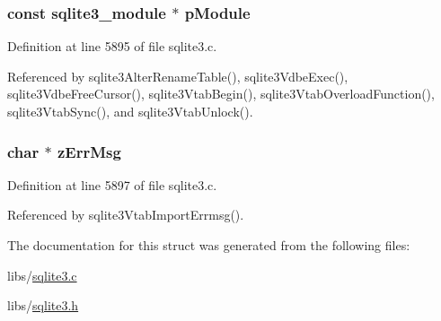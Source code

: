 \hypertarget{structsqlite3__vtab_a68871c21cfdca68ce4a92d7ff3395ce0}{}
\subsubsection[{p\+Module}]{\setlength{\rightskip}{0pt plus 5cm}const {\bf sqlite3\+\_\+module} $\ast$ p\+Module}\label{structsqlite3__vtab_a68871c21cfdca68ce4a92d7ff3395ce0}


Definition at line 5895 of file sqlite3.\+c.



Referenced by sqlite3\+Alter\+Rename\+Table(), sqlite3\+Vdbe\+Exec(), sqlite3\+Vdbe\+Free\+Cursor(), sqlite3\+Vtab\+Begin(), sqlite3\+Vtab\+Overload\+Function(), sqlite3\+Vtab\+Sync(), and sqlite3\+Vtab\+Unlock().

\hypertarget{structsqlite3__vtab_a80b3fc7c10851d42f781fa205fe68c17}{}
\subsubsection[{z\+Err\+Msg}]{\setlength{\rightskip}{0pt plus 5cm}char $\ast$ z\+Err\+Msg}\label{structsqlite3__vtab_a80b3fc7c10851d42f781fa205fe68c17}


Definition at line 5897 of file sqlite3.\+c.



Referenced by sqlite3\+Vtab\+Import\+Errmsg().



The documentation for this struct was generated from the following files\+:\begin{DoxyCompactItemize}
\item 
libs/\hyperlink{sqlite3_8c}{sqlite3.\+c}\item 
libs/\hyperlink{sqlite3_8h}{sqlite3.\+h}\end{DoxyCompactItemize}
